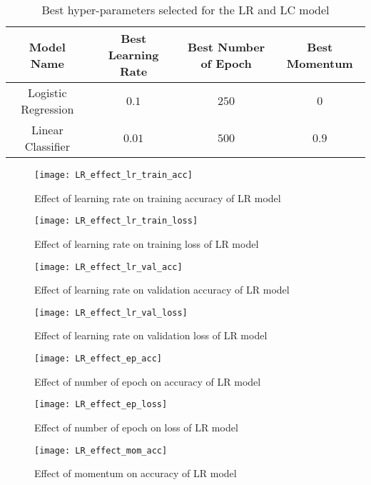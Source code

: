 \documentclass[12pt, a4paper, twoside]{article}
\begin{document}
\begin{table}
	\begin{center}
		\begin{tabular}{c c c c}
			\hline
			Model Name & Best Learning Rate & Best Number of Epoch & Best Momentum \\ \hline
			Logistic Regression & $0.1$ & $250$ & $0$ \\ \hline
			Linear Classifier & $0.01$ & $500$ & $0.9$ \\ \hline
		\end{tabular}
		\caption{Best hyper-parameters selected for the LR and LC model}\label{T:lrlc}
	\end{center}
\end{table}
\begin{figure}[p]
	\centering
	\texttt{[image: LR\_effect\_lr\_train\_acc]}
	\caption{Effect of learning rate on training accuracy of LR model}
	\label{F:LR_effect_lr_train_acc}
\end{figure}
\begin{figure}[p]
	\centering
	\texttt{[image: LR\_effect\_lr\_train\_loss]}
	\caption{Effect of learning rate on training loss of LR model}
	\label{F:LR_effect_lr_train_loss}
\end{figure}
\begin{figure}[p]
	\centering
	\texttt{[image: LR\_effect\_lr\_val\_acc]}
	\caption{Effect of learning rate on validation accuracy of LR model}
	\label{F:LR_effect_lr_val_acc}
\end{figure}
\begin{figure}[p]
	\centering
	\texttt{[image: LR\_effect\_lr\_val\_loss]}
	\caption{Effect of learning rate on validation loss of LR model}
	\label{F:LR_effect_lr_val_loss}
\end{figure}
\begin{figure}[p]
	\centering
	\texttt{[image: LR\_effect\_ep\_acc]}
	\caption{Effect of number of epoch on  accuracy of LR model}
	\label{F:LR_effect_ep_acc}
\end{figure}
\begin{figure}[p]
	\centering
	\texttt{[image: LR\_effect\_ep\_loss]}
	\caption{Effect of number of epoch on loss of LR model}
	\label{F:LR_effect_ep_loss}
\end{figure}
\begin{figure}[p]
	\centering
	\texttt{[image: LR\_effect\_mom\_acc]}
	\caption{Effect of momentum on  accuracy of LR model}
	\label{F:LR_effect_mom_acc}
\end{figure}
\end{document}
